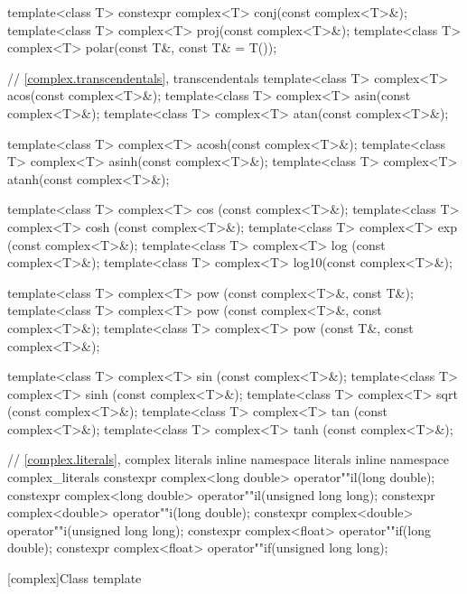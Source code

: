 \begin{codeblock}
{  template<class T> constexpr complex<T> conj(const complex<T>&);
  template<class T> complex<T> proj(const complex<T>&);
  template<class T> complex<T> polar(const T&, const T& = T());

  // \ref{complex.transcendentals}, transcendentals
  template<class T> complex<T> acos(const complex<T>&);
  template<class T> complex<T> asin(const complex<T>&);
  template<class T> complex<T> atan(const complex<T>&);

  template<class T> complex<T> acosh(const complex<T>&);
  template<class T> complex<T> asinh(const complex<T>&);
  template<class T> complex<T> atanh(const complex<T>&);

  template<class T> complex<T> cos  (const complex<T>&);
  template<class T> complex<T> cosh (const complex<T>&);
  template<class T> complex<T> exp  (const complex<T>&);
  template<class T> complex<T> log  (const complex<T>&);
  template<class T> complex<T> log10(const complex<T>&);

  template<class T> complex<T> pow  (const complex<T>&, const T&);
  template<class T> complex<T> pow  (const complex<T>&, const complex<T>&);
  template<class T> complex<T> pow  (const T&, const complex<T>&);

  template<class T> complex<T> sin  (const complex<T>&);
  template<class T> complex<T> sinh (const complex<T>&);
  template<class T> complex<T> sqrt (const complex<T>&);
  template<class T> complex<T> tan  (const complex<T>&);
  template<class T> complex<T> tanh (const complex<T>&);

  // \ref{complex.literals}, complex literals
  inline namespace literals {
  inline namespace complex_literals {
    constexpr complex<long double> operator""il(long double);
    constexpr complex<long double> operator""il(unsigned long long);
    constexpr complex<double> operator""i(long double);
    constexpr complex<double> operator""i(unsigned long long);
    constexpr complex<float> operator""if(long double);
    constexpr complex<float> operator""if(unsigned long long);
  }
  }
}
\end{codeblock}

[complex]{Class template }


